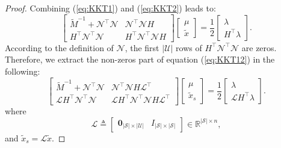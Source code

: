 \documentclass[journal]{IEEEtran}
\newcommand{\Rb}{{\mathbb{R}}}
\newcommand{\Uc}{{\mathcal{U}}}
\newcommand{\Sc}{{\mathcal{S}}}
\newcommand{\Nc}{{\mathcal{N}}}
\newcommand{\Lc}{{\mathcal{L}}}
\newtheorem*{proof}{\textbf{Proof}}
\begin{document}
\begin{proof}
		Combining (\ref{eq:KKT1}) and (\ref{eq:KKT2}) leads to:
		\begin{equation}\label{eq:KKT12}
			\begin{bmatrix}
				\tilde{M}^{-1}+\Nc^{\top}\Nc & \Nc^{\top} \Nc H\\
				H^{\top} \Nc^{\top} \Nc  & H^{\top} \Nc^{\top} \Nc H
			\end{bmatrix}
			\begin{bmatrix}
				\mu \\ \tilde{x}
			\end{bmatrix}=\frac{1}{2}
			\begin{bmatrix}
				\lambda \\ H^{\top} \lambda 
			\end{bmatrix}.
		\end{equation}
		According to the definition of $\Nc$, the first $|\Uc|$ rows of $H^{\top} \Nc^{\top} \Nc$ are zeros. Therefore, we extract the non-zeros part of equation (\ref{eq:KKT12}) in the following:
		\begin{equation}\label{eq:KKT12_nonzero}
			\begin{bmatrix}
				\tilde{M}^{-1}+\Nc^{\top}\Nc & \Nc^{\top} \Nc H \Lc^{\top}\\
				\Lc H^{\top} \Nc^{\top} \Nc  &  \Lc H^{\top} \Nc^{\top} \Nc H \Lc^{\top}
			\end{bmatrix}
			\begin{bmatrix}
				\mu \\ \tilde{x}_s
			\end{bmatrix}=\frac{1}{2}
			\begin{bmatrix}
				\lambda \\ \Lc H^{\top} \lambda 
			\end{bmatrix}.
		\end{equation}
		where 
		$$\Lc\triangleq 
		\begin{bmatrix}
			\mathbf{0}_{|\Sc|\times|\Uc|} & I_{|\Sc|\times|\Sc|}
		\end{bmatrix}
		\in \Rb^{|\Sc|\times n },
		$$
		and $\tilde{x}_s=\Lc \tilde{x}$.
		
		

\end{proof}
\end{document}
